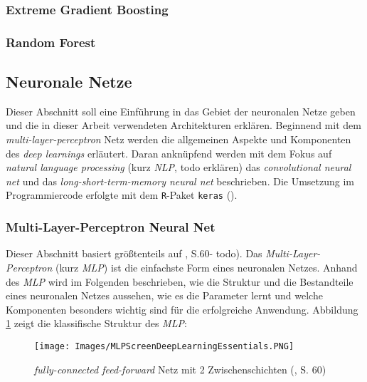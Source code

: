 \documentclass[a4paper,11pt]{article}
\begin{document}
\subsubsection{Extreme Gradient Boosting}\label{kap:XG}
\subsubsection{Random Forest}\label{kap:RF}

\subsection{Neuronale Netze} \label{kap:neuralNets}

Dieser Abschnitt soll eine Einführung in das Gebiet der neuronalen Netze geben und die in dieser Arbeit verwendeten Architekturen erklären. Beginnend mit dem \textit{multi-layer-perceptron} Netz werden die allgemeinen Aspekte und Komponenten des \textit{deep learnings} erläutert. Daran anknüpfend werden mit dem Fokus auf \textit{natural language processing} (kurz \textit{NLP}, todo erklären) das \textit{convolutional neural net} und das \textit{long-short-term-memory neural net} beschrieben. Die Umsetzung im Programmiercode erfolgte mit dem \texttt{R}-Paket \texttt{keras} (\cite{kerasR}).


\subsubsection{Multi-Layer-Perceptron Neural Net}

Dieser Abschnitt basiert größtenteils auf \cite{deepEssentials}, S.60- todo).
Das \textit{Multi-Layer-Perceptron} (kurz \textit{MLP}) ist die einfachste Form eines neuronalen Netzes. Anhand des \textit{MLP} wird im Folgenden beschrieben, wie die Struktur und die Bestandteile eines neuronalen Netzes aussehen, wie es die Parameter lernt und welche Komponenten besonders wichtig sind für die erfolgreiche Anwendung. Abbildung \ref{abb:MLPScreen} zeigt die klassifische Struktur des \textit{MLP}:


\begin{figure}[!ht]
\begin{center}
\texttt{[image: Images/MLPScreenDeepLearningEssentials.PNG]}
\label{abb:MLPScreen}
\caption{\textit{fully-connected feed-forward} Netz mit 2 Zwischenschichten  (\cite{deepEssentials}, S. 60) }
\end{center}
\end{figure}
\end{document}
